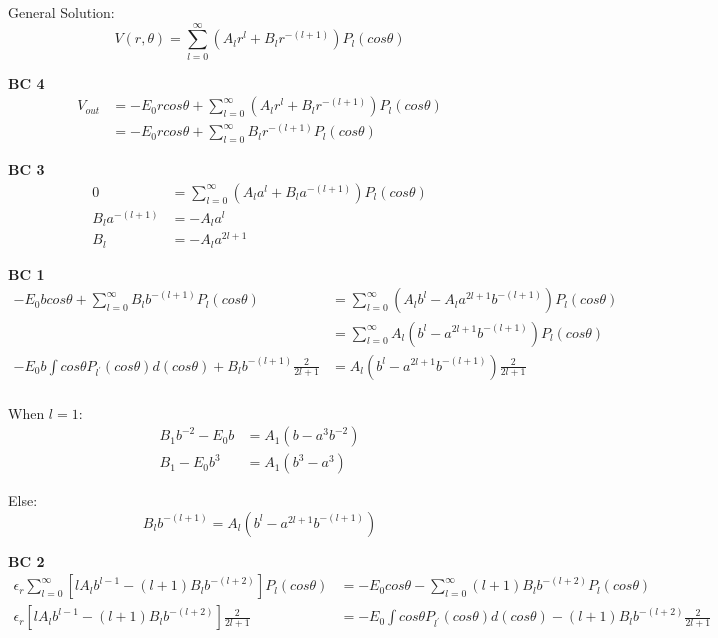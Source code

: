 \documentclass{article}
\begin{document}
General Solution:
$$V(r, \theta) = \sum_{l = 0}^{\infty} (A_l r^l + B_l r^{-(l+1)}) P_l (cos\theta)$$

\textbf{BC 4}
\begin{equation*}
\begin{split}
	V_{out} & = - E_0 r cos\theta + \sum_{l = 0}^{\infty} (A_l r^l + B_l r^{-(l+1)}) P_l (cos\theta) \\
	& = - E_0 r cos\theta + \sum_{l = 0}^{\infty} B_l r^{-(l+1)} P_l (cos\theta)
\end{split}
\end{equation*}

\textbf{BC 3}
\begin{equation*}
\begin{split}
	0 & = \sum_{l = 0}^{\infty} (A_l a^l + B_l a^{-(l+1)}) P_l (cos\theta) \\
	B_l a^{-(l+1)} & = - A_l a^l \\
	B_l & = - A_l a^{2l+1}
\end{split}
\end{equation*}

\textbf{BC 1}
\begin{equation*}
\begin{split}
	- E_0 b cos\theta + \sum_{l=0}^{\infty} B_l b^{-(l+1)} P_l (cos\theta) & = \sum_{l=0}^{\infty} (A_l b^l - A_l a^{2l+1} b^{-(l+1)}) P_l (cos\theta) \\
	& = \sum_{l=0}^{\infty} A_l (b^l - a^{2l+1} b^{-(l+1)}) P_l (cos\theta) \\
	- E_0 b \int cos\theta P_{l^\prime} (cos\theta) d(cos\theta) + B_l b^{-(l+1)} \frac{2}{2l+1} & = A_l (b^l - a^{2l+1} b^{-(l+1)}) \frac{2}{2l+1} \\
\end{split}
\end{equation*}

When $l = 1$:
\begin{equation*}
\begin{split}
	B_1 b^{-2} - E_0 b & = A_1 (b - a^3 b^{-2}) \\
	B_1 - E_0 b^3 & = A_1 (b^3 - a^3)
\end{split}
\end{equation*}

Else:
$$B_l b^{-(l+1)} = A_l (b^l - a^{2l+1} b^{-(l+1)})$$ 

\textbf{BC 2}
\begin{equation*}
\begin{split}
	\epsilon_r \sum_{l=0}^{\infty}[l A_l b^{l-1} - (l+1) B_l b^{-(l+2)}] P_l (cos\theta) & = - E_0 cos\theta - \sum_{l=0}^{\infty} (l+1) B_l b^{-(l+2)} P_l (cos\theta) \\
	\epsilon_r [l A_l b^{l-1} - (l+1) B_l b^{-(l+2)}] \frac{2}{2l+1} & = - E_0 \int cos\theta P_{l^\prime} (cos\theta) d(cos\theta) - (l+1) B_l b^{-(l+2)} \frac{2}{2l+1}
\end{split}
\end{equation*}
\end{document}
